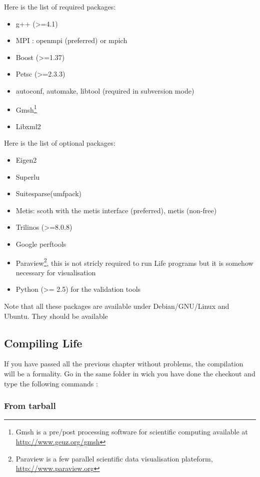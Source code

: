 \documentclass[a4paper]{book}
\newcommand{\life}{Life\xspace}
\begin{document}
Here is the list of required packages:
\begin{itemize}
\item g++ (>=4.1)
\item MPI : openmpi (preferred) or mpich
\item Boost (>=1.37)
\item Petsc (>=2.3.3)
\item autoconf, automake, libtool (required in subversion mode)
\item Gmsh\footnote{Gmsh is a pre/post processing software for scientific
computing available at \url{http://www.geuz.org/gmsh}}
\item Libxml2
\end{itemize}

Here is the list of optional packages:
\begin{itemize}
\item Eigen2
\item Superlu
\item Suitesparse(umfpack)
\item Metis: scoth with the metis interface (preferred), metis (non-free)
\item Trilinos (>=8.0.8)
\item Google perftools
\item Paraview\footnote{Paraview is a few parallel scientific data
    visualisation plateform, \url{http://www.paraview.org}}, this is
  not stricly required to run \life programs but it is somehow
  necessary for visualisation
\item Python (>= 2.5) for the validation tools
\end{itemize}

Note that all these packages are available under Debian/GNU/Linux and
Ubuntu. They should be available

\subsection{Compiling Life}

If you have passed all the previous chapter without problems, the
compilation will be a formality.  Go in the same folder in wich you
have done the checkout and type the following commands :

\subsubsection{From tarball}
\label{sec:from-tarball}
\end{document}
